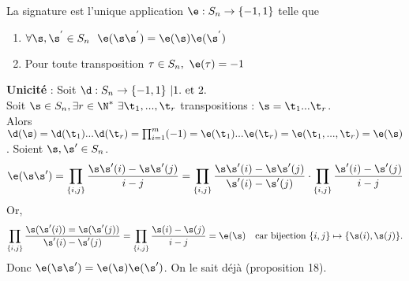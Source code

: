 \documentclass[11pt]{article}
\begin{document}
\begin{thm}{}{}
    La signature est l'unique application $\e : S_{n} \to \{ -1, 1 \}$ telle que
    \begin{enumerate}
        \item $\forall \s, \s^{'} \in S_{n} ~~ \e(\s \s^{'}) = \e(\s) \e(\s^{'})$
        \item Pour toute transposition $\tau \in S_{n}, ~ \e(\tau) = -1$
    \end{enumerate}
    \tcblower
    \textbf{Unicité} : Soit $\d:S_n\to\{-1,1\} ~ | 1. \text{ et } 2.$\\
    Soit $\s\in S_n, \exists r\in\N^* ~ \exists \t_1,...,\t_r$ transpositions : $\s=\t_1...\t_r$.\\
    Alors $\d(\s)=\d(\t_1)...\d(\t_r)=\prod_{i=1}^m(-1)=\e(\t_1)...\e(\t_r)=\e(\t_1,...,\t_r)=\e(\s)$.\n
     Soient $\s,\s'\in S_n$.
    \begin{equation*}
        \e(\s\s')=\prod_{\{i,j\}}\frac{\s\s'(i)-\s\s'(j)}{i-j}=\prod_{\{i,j\}}\frac{\s\s'(i)-\s\s'(j)}{\s'(i)-\s'(j)}\cdot\prod_{\{i,j\}}\frac{\s'(i)-\s'(j)}{i-j}
    \end{equation*}
    Or, 
    \begin{equation*}
        \prod_{\{i,j\}}\frac{\s(\s'(i))=\s(\s'(j))}{\s'(i)-\s'(j)}=\prod_{\{i,j\}}\frac{\s(i)-\s(j)}{i-j}=\e(\s) \quad \text{car bijection } \{i,j\}\mapsto\{\s(i),\s(j)\}.
    \end{equation*}
    Donc $\e(\s\s')=\e(\s)\e(\s')$.\n
     On le sait déjà (proposition 18).
\end{thm}

\vspace*{0.4cm}
\end{document}
